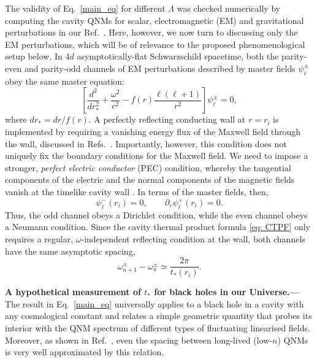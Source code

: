 \documentclass[prd,aps,twocolumn,amsfonts,showpacs,superscriptaddress,preprintnumbers,nofootinbib]{revtex4-2}
\begin{document}
The validity of Eq.~\eqref{main_eq} for different $\Lambda$ was checked numerically by computing the cavity QNMs for scalar, electromagnetic (EM) and gravitational perturbations in our Ref.~\cite{Grozdanov:2026ktq}. Here, however, we now turn to discussing only the EM perturbations, which will be of relevance to the proposed phenomenological setup below. In 4$d$ asymptotically-flat Schwarzschild spacetime, both the parity-even and parity-odd channels of EM perturbations described by master fields $\psi_\ell^\pm$ obey the same master equation:
\begin{equation}
\left[\frac{d^2}{dr_*^2} +\frac{\omega^2}{c^2} -f(r)\frac{\ell(\ell+1)}{r^2} \right]\psi_\ell^\pm=0,
\end{equation}
where $dr_*=dr/f(r)$. A perfectly reflecting conducting wall at $r=r_i$ is implemented by requiring a vanishing energy flux of the Maxwell field through the wall, discussed in Refs.~\cite{Wang:2015goa,Lei:2021kqv}. Importantly, however, this condition does not uniquely fix the boundary conditions for the Maxwell field. We need to impose a stronger, \textit{perfect electric conductor} (PEC) condition, whereby the tangential components of the electric 
and the normal components of the magnetic fields vanish at the timelike cavity wall \cite{Brito:2015oca}. In terms of the master fields, then, 
\begin{equation}
    \psi_\ell^-(r_i)=0,
    \qquad
    \partial_r\psi_\ell^+(r_i)=0 .
\end{equation}
Thus, the odd channel obeys a Dirichlet condition, while the even channel obeys a Neumann condition. Since the cavity thermal product formula \eqref{eq: CTPF} only requires a regular, $\omega$-independent reflecting condition at the wall, both channels have the same asymptotic spacing,
\begin{equation}
    \omega_{n+1}^{\pm}-\omega_n^{\pm}
    \simeq \frac{2\pi}{t_*(r_i)} .
\end{equation}


{\bf A hypothetical measurement of $t_*$ for black holes in our Universe.---}The result in Eq.~\eqref{main_eq} universally applies to a black hole in a cavity with any cosmological constant  and relates a simple geometric quantity that probes its interior with the QNM spectrum of different types of fluctuating linearised fields. Moreover, as shown in Ref.~\cite{Grozdanov:2026ktq}, even the spacing between long-lived (low-$n$) QNMs is very well approximated by this relation. 
\end{document}
